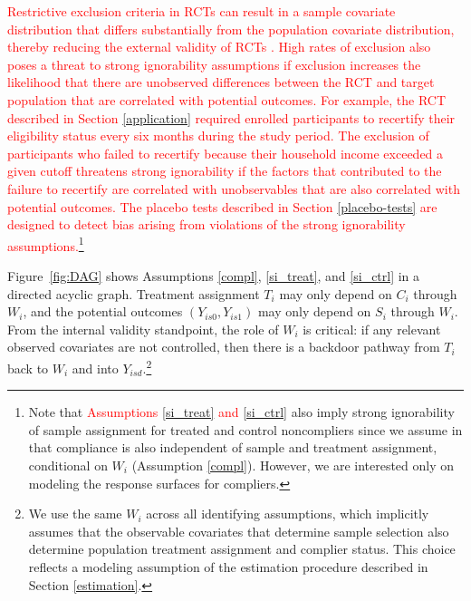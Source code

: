 \documentclass[hidelinks,12pt]{article}
\begin{document}
\textcolor{red}{Restrictive exclusion criteria in RCTs can result in a sample covariate distribution that differs substantially from the population covariate distribution, thereby reducing the external validity of RCTs \citep{rothwell2005external}. High rates of exclusion also poses a threat to strong ignorability assumptions if exclusion increases the likelihood that there are unobserved differences between the RCT and target population that are correlated with potential outcomes. For example, the RCT described in Section \ref{application} required enrolled participants to recertify their eligibility status every six months during the study period. The exclusion of participants who failed to recertify because their household income exceeded a given cutoff threatens strong ignorability if the factors that contributed to the failure to recertify are correlated with unobservables that are also correlated with potential outcomes. The placebo tests described in Section \ref{placebo-tests} are designed to detect bias arising from violations of the strong ignorability assumptions.}\footnote{Note that \textcolor{red}{Assumptions \eqref{si_treat} and \eqref{si_ctrl}} also imply strong ignorability of sample assignment for treated and control noncompliers since we assume in that compliance is also independent of sample and treatment assignment, conditional on $W_i$ (Assumption \eqref{compl}). However, we are interested only on modeling the response surfaces for compliers.}

Figure~\ref{fig:DAG} shows Assumptions \eqref{compl}, \eqref{si_treat}, and \eqref{si_ctrl} in a directed acyclic graph. Treatment assignment $T_i$ may only depend on $C_i$ through $W_i$, and the potential outcomes $(Y_{is0}, Y_{is1})$ may only depend on $S_i$ through $W_i$. From the internal validity standpoint, the role of $W_i$ is critical: if any relevant observed covariates are not controlled, then there is a backdoor pathway from $T_i$ back to $W_i$ and into $Y_{isd}$.\footnote{We use the same $W_i$ across all identifying assumptions, which implicitly assumes that the observable covariates that determine sample selection also determine population treatment assignment and complier status. This choice reflects a modeling assumption of the estimation procedure described in Section \ref{estimation}.}
\end{document}
